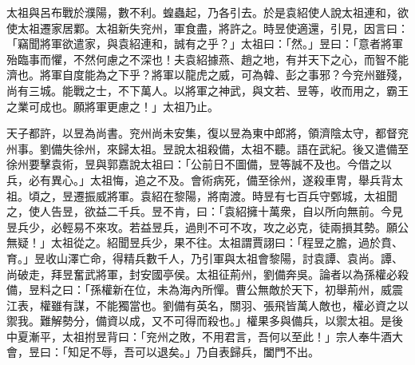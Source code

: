 \begin{pinyinscope}
 
太祖與呂布戰於濮陽，數不利。蝗蟲起，乃各引去。於是袁紹使人說太祖連和，欲使太祖遷家居鄴。太祖新失兖州，軍食盡，將許之。時昱使適還，引見，因言曰：「竊聞將軍欲遣家，與袁紹連和，誠有之乎？」太祖曰：「然。」昱曰：「意者將軍殆臨事而懼，不然何慮之不深也！夫袁紹據燕、趙之地，有并天下之心，而智不能濟也。將軍自度能為之下乎？將軍以龍虎之威，可為韓、彭之事邪？今兖州雖殘，尚有三城。能戰之士，不下萬人。以將軍之神武，與文若、昱等，收而用之，霸王之業可成也。願將軍更慮之！」太祖乃止。
 
 
天子都許，以昱為尚書。兖州尚未安集，復以昱為東中郎將，領濟陰太守，都督兖州事。劉備失徐州，來歸太祖。昱說太祖殺備，太祖不聽。語在武紀。後又遣備至徐州要擊袁術，昱與郭嘉說太祖曰：「公前日不圖備，昱等誠不及也。今借之以兵，必有異心。」太祖悔，追之不及。會術病死，備至徐州，遂殺車冑，舉兵背太祖。頃之，昱遷振威將軍。袁紹在黎陽，將南渡。時昱有七百兵守鄄城，太祖聞之，使人告昱，欲益二千兵。昱不肯，曰：「袁紹擁十萬衆，自以所向無前。今見昱兵少，必輕易不來攻。若益昱兵，過則不可不攻，攻之必克，徒兩損其勢。願公無疑！」太祖從之。紹聞昱兵少，果不往。太祖謂賈詡曰：「程昱之膽，過於賁、育。」昱收山澤亡命，得精兵數千人，乃引軍與太祖會黎陽，討袁譚、袁尚。譚、尚破走，拜昱奮武將軍，封安國亭侯。太祖征荊州，劉備奔吳。論者以為孫權必殺備，昱料之曰：「孫權新在位，未為海內所憚。曹公無敵於天下，初舉荊州，威震江表，權雖有謀，不能獨當也。劉備有英名，關羽、張飛皆萬人敵也，權必資之以禦我。難解勢分，備資以成，又不可得而殺也。」權果多與備兵，以禦太祖。是後中夏漸平，太祖拊昱背曰：「兖州之敗，不用君言，吾何以至此！」宗人奉牛酒大會，昱曰：「知足不辱，吾可以退矣。」乃自表歸兵，闔門不出。
 

\end{pinyinscope}
